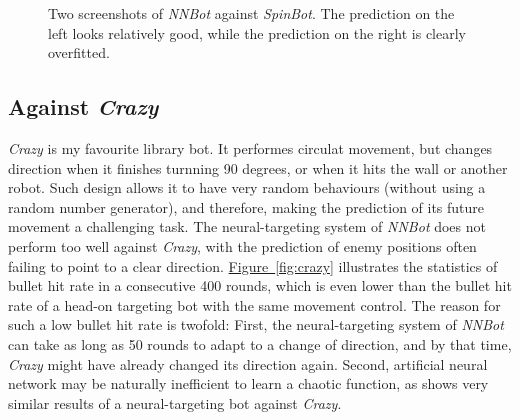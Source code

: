\documentclass[11pt,a4paper]{article}
\begin{document}
\begin{figure}[h]
\begin{subfigure}
	\end{subfigure}
	\caption{Two screenshots of \emph{NNBot} against \emph{SpinBot}. The prediction on the left looks relatively good, while the prediction on the right is clearly overfitted.}
	\label{fig:spin}
\end{figure}

\subsection{Against \emph{Crazy}}

\emph{Crazy} is my favourite library bot. It performes circulat movement, but changes direction when it finishes turnning 90 degrees, or when it hits the wall or another robot. Such design allows it to have very random behaviours (without using a random number generator), and therefore, making the prediction of its future movement a challenging task. The neural-targeting system of \emph{NNBot} does not perform too well against \emph{Crazy}, with the prediction of enemy positions often failing to point to a clear direction. \hyperref[fig:crazy]{Figure~\ref{fig:crazy}} illustrates the statistics of bullet hit rate in a consecutive 400 rounds, which is even lower than the bullet hit rate of a head-on targeting bot with the same movement control. The reason for such a low bullet hit rate is twofold: First, the neural-targeting system of \emph{NNBot} can take as long as 50 rounds to adapt to a change of direction, and by that time, \emph{Crazy} might have already changed its direction again. Second, artificial neural network may be naturally inefficient to learn a chaotic function, as \cite{ann_robocode} shows very similar results of a neural-targeting bot against \emph{Crazy}.
\end{document}
